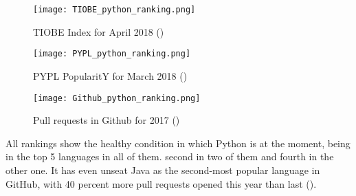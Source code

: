 \begin{figure}[h!b]
	\centering
	\texttt{[image: TIOBE\_python\_ranking.png]}
	\caption{TIOBE Index for April 2018 (\cite{tiobe_index})}
	\label{fig:tiobe_rank}
\end{figure}

\begin{figure}[h!b]
	\centering
	\texttt{[image: PYPL\_python\_ranking.png]}
	\caption{PYPL PopularitY for March 2018 (\cite{pypl_pop_rank})}
	\label{fig:pypl_rank}
\end{figure}

\begin{figure}[h!b]
	\centering
	\texttt{[image: Github\_python\_ranking.png]}
	\caption{Pull requests in Github for 2017 (\cite{octoverse_2017})}
	\label{fig:github_octoverse_rank}
\end{figure}

All rankings show the healthy condition in which Python is at the moment, being in the top 5 languages in all of them. second in two of them and fourth in the other one. It has even unseat Java as the second-most popular language in GitHub, with 40 percent more pull requests opened this year than last (\cite{octoverse_2017}). 